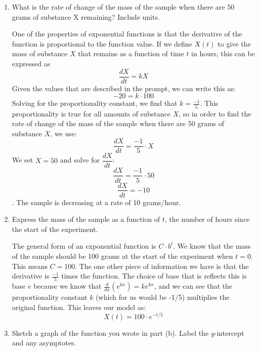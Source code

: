 \documentclass{article}
\theoremstyle{theorem}
\begin{document}
\begin{enumerate}
\begin{enumerate}
    \item 
    \begin{problem}[\vfill]What is the rate of change of the mass of the sample when there are 50 grams of substance X remaining? Include units.
    \end{problem}
\begin{solution}
    One of the properties of exponential functions is that the derivative of the function is proportional to the function value. If we define $X(t)$ to give the mass of substance $X$ that remains as a function of time $t$ in hours, this can be expressed as 
    $$\dfrac{dX}{dt}=kX$$
    Given the values that are described in the prompt, we can write this as:
    $$-20=k\cdot 100$$
    Solving for the proportionality constant, we find that $k=\frac{-1}{5}$. This proportionality is true for all amounts of substance $X$, so in order to find the rate of change of the mass of the sample when there are 50 grams of substance $X$, we use:
    $$\frac{dX}{dt}=\frac{-1}{5}\cdot X$$
    We set $X=50$ and solve for $\dfrac{dX}{dt}$:
    $$\frac{dX}{dt}=\frac{-1}{5}\cdot 50$$
    $$\frac{dX}{dt}=-10$$.
    The sample is decreasing at a rate of 10 grams/hour.
\end{solution}
    \item 
    \begin{problem}[\vfill] Express the mass of the sample as a function of $t$, the number of hours since the start of the experiment.\\
    \end{problem}
\begin{solution}
    The general form of an exponential function is $C\cdot b^t$. We know that the mass of the sample should be 100 grams at the start of the experiment when $t=0$. This means $C=100$. The one other piece of information we have is that the derivative is $\frac{-1}{5}$ times the function. The choice of base that is reflects this is base $e$ because we know that $\frac{d}{dx}(e^{kx}) = ke^{kx}$, and we can see that the proportionality constant $k$ (which for us would be -1/5) multiplies the original function. This leaves our model as:
    $$X(t) = 100\cdot e^{-t/5}$$
\end{solution}
    \item 
    \begin{problem}Sketch a graph of the function you wrote in part (b). Label the $y$-intercept and any asymptotes.\\
    

\end{problem}
\end{enumerate}
\end{enumerate}
\end{document}
